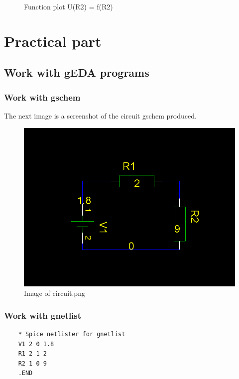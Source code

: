 \documentclass{report}
\begin{document}
\begin{figure}[!b]
    \centering
    \caption{Function plot U(R2) = f(R2)}
\end{figure}

\chapter{Practical part}
\section{Work with gEDA programs}
\subsection{Work with gschem}
The next image is a screenshot of the circuit gschem produced.
\begin{figure}[!b]
    \includegraphics[scale=0.4]{circuit.png}
    \caption{Image of circuit.png}
\end{figure}
\subsection{Work with gnetlist}
\begin{verbatim}
    * Spice netlister for gnetlist
    V1 2 0 1.8
    R1 2 1 2
    R2 1 0 9
    .END
\end{verbatim}
\end{document}
